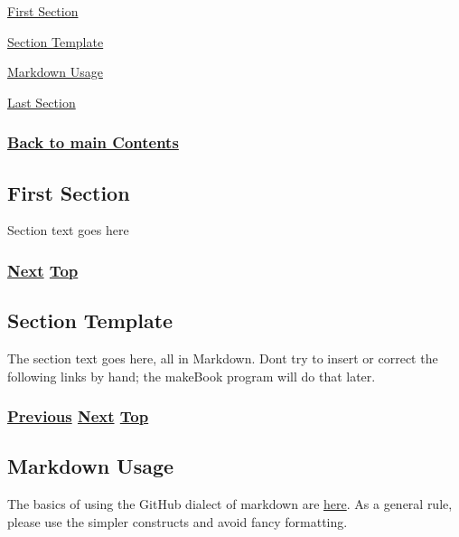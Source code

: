 \documentclass[
]{article}
\begin{document}
\hyperref[first-section]{First Section}

\hyperref[section-template]{Section Template}

\hyperref[markdown-usage]{Markdown Usage}

\hyperref[last-section]{Last Section}

\subsubsection{\texorpdfstring{\hyperref[list-of-contents]{Back to main
Contents}}{Back to main Contents}}\label{back-to-main-contents-10}

\pagebreak

\subsection{First Section}\label{first-section}

Section text goes here

\subsubsection{\texorpdfstring{\hyperref[section-template]{Next}
\hyperref[chapter-template]{Top}}{Next Top}}\label{next-top-7}

\pagebreak

\subsection{Section Template}\label{section-template}

The section text goes here, all in Markdown. Don\textquotesingle t try
to insert or correct the following links by hand; the makeBook program
will do that later.

\subsubsection{\texorpdfstring{\hyperref[first-section]{Previous}
\hyperref[markdown-usage]{Next}
\hyperref[chapter-template]{Top}}{Previous Next Top}}\label{previous-next-top-30}

\pagebreak

\subsection{Markdown Usage}\label{markdown-usage}

The basics of using the GitHub dialect of markdown are
\href{https://docs.github.com/en/get-started/writing-on-github/getting-started-with-writing-and-formatting-on-github/basic-writing-and-formatting-syntax}{here}.
As a general rule, please use the simpler constructs and avoid fancy
formatting.
\end{document}
